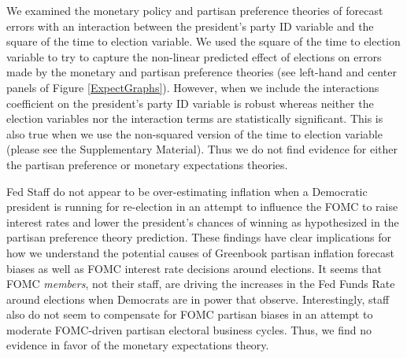 \documentclass[a4paper]{article}
\begin{document}
We examined the monetary policy and partisan preference theories of forecast errors with an interaction between the president's party ID variable and the square of the time to election variable. We used the square of the time to election variable to try to capture the non-linear predicted effect of elections on errors made by the monetary and partisan preference theories (see left-hand and center panels of Figure \ref{ExpectGraphs}). However, when we include the interactions coefficient on the president's party ID variable is robust whereas neither the election variables nor the interaction terms are statistically significant. This is also true when we use the non-squared version of the time to election variable (please see the Supplementary Material). Thus we do not find evidence for either the partisan preference or monetary expectations theories.

Fed Staff do not appear to be over-estimating inflation when a Democratic president is running for re-election in an attempt to influence the FOMC to raise interest rates and lower the president's chances of winning as hypothesized in the partisan preference theory prediction. These findings have clear implications for how we understand the potential causes of Greenbook partisan inflation forecast biases as well as FOMC interest rate decisions around elections. It seems that FOMC \emph{members}, not their staff, are driving the increases in the Fed Funds Rate around elections when Democrats are in power that \cite{Clark2012} observe. Interestingly, staff also do not seem to compensate for FOMC partisan biases in an attempt to moderate FOMC-driven partisan electoral business cycles. Thus, we find no evidence in favor of the monetary expectations theory.
\end{document}

